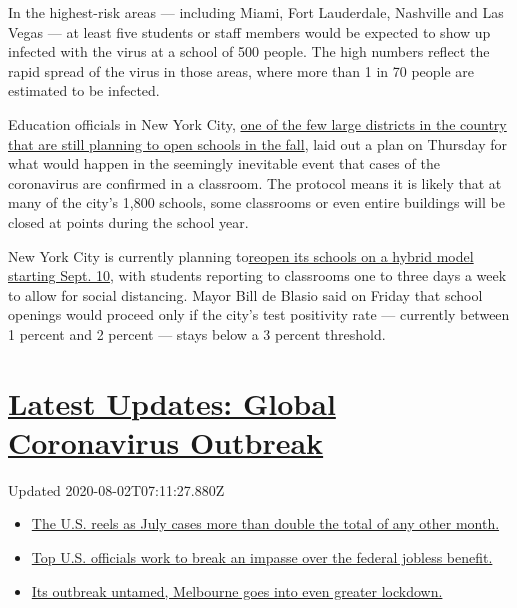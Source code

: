 In the highest-risk areas --- including Miami, Fort Lauderdale,
Nashville and Las Vegas --- at least five students or staff members
would be expected to show up infected with the virus at a school of 500
people. The high numbers reflect the rapid spread of the virus in those
areas, where more than 1 in 70 people are estimated to be infected.

Education officials in New York City,
\href{https://www.nytimes.com/2020/07/14/us/coronavirus-schools-fall.html}{one
of the few large districts in the country that are still planning to
open schools in the fall}, laid out a plan on Thursday for what would
happen in the seemingly inevitable event that cases of the coronavirus
are confirmed in a classroom. The protocol means it is likely that at
many of the city's 1,800 schools, some classrooms or even entire
buildings will be closed at points during the school year.

New York City is currently planning
to\href{https://www.nytimes.com/2020/07/08/nyregion/nyc-schools-reopening-plan.html}{reopen
its schools on a hybrid model starting Sept. 10}, with students
reporting to classrooms one to three days a week to allow for social
distancing. Mayor Bill de Blasio said on Friday that school openings
would proceed only if the city's test positivity rate --- currently
between 1 percent and 2 percent --- stays below a 3 percent threshold.

\hypertarget{latest-updates-global-coronavirus-outbreak}{%
\section{\texorpdfstring{\href{https://www.nytimes.com/2020/08/01/world/coronavirus-covid-19.html?action=click\&pgtype=Article\&state=default\&region=MAIN_CONTENT_1\&context=storylines_live_updates}{Latest
Updates: Global Coronavirus
Outbreak}}{Latest Updates: Global Coronavirus Outbreak}}\label{latest-updates-global-coronavirus-outbreak}}

Updated 2020-08-02T07:11:27.880Z

\begin{itemize}
\tightlist
\item
  \href{https://www.nytimes.com/2020/08/01/world/coronavirus-covid-19.html?action=click\&pgtype=Article\&state=default\&region=MAIN_CONTENT_1\&context=storylines_live_updates\#link-34047410}{The
  U.S. reels as July cases more than double the total of any other
  month.}
\item
  \href{https://www.nytimes.com/2020/08/01/world/coronavirus-covid-19.html?action=click\&pgtype=Article\&state=default\&region=MAIN_CONTENT_1\&context=storylines_live_updates\#link-780ec966}{Top
  U.S. officials work to break an impasse over the federal jobless
  benefit.}
\item
  \href{https://www.nytimes.com/2020/08/01/world/coronavirus-covid-19.html?action=click\&pgtype=Article\&state=default\&region=MAIN_CONTENT_1\&context=storylines_live_updates\#link-2bc8948}{Its
  outbreak untamed, Melbourne goes into even greater lockdown.}
\end{itemize}

